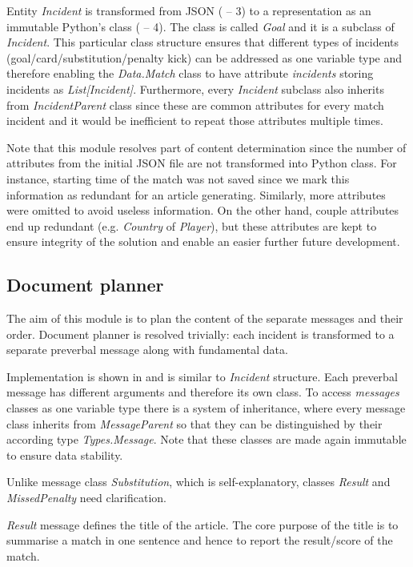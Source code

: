 Entity \emph{Incident} is transformed from JSON ( -- 3) to a representation as an immutable Python's class ( -- 4). The class is called \emph{Goal} and it is a subclass of \emph{Incident}. This particular class structure ensures that different types of incidents (goal/card/substitution/penalty kick) can be addressed as one variable type and therefore enabling the \textit{Data.Match} class to have attribute \textit{incidents} storing incidents as \emph{List[Incident]}. Furthermore, every \textit{Incident} subclass also inherits from \emph{IncidentParent} class since these are common attributes for every match incident and it would be inefficient to repeat those attributes multiple times.

Note that this module resolves part of content determination since the number of attributes from the initial JSON file are not transformed into Python class. For instance, starting time of the match was not saved since we mark this information as redundant for an article generating. Similarly, more attributes were omitted to avoid useless information. On the other hand, couple attributes end up redundant (e.g. \textit{Country} of \textit{Player}), but these attributes are kept to ensure integrity of the solution and enable an easier further future development. 

\subsection{Document planner}

The aim of this module is to plan the content of the separate messages and their order. Document planner is resolved trivially: each incident is transformed to a separate preverbal message along with fundamental data. 

Implementation is shown in  and is similar to \textit{Incident} structure. Each preverbal message has different arguments and therefore its own class. To access \textit{messages} classes as one variable type there is a system of inheritance, where every message class inherits from \textit{MessageParent} so that they can be distinguished by their according type \textit{Types.Message}. Note that these classes are made again immutable to ensure data stability.

Unlike message class \textit{Substitution}, which is self-explanatory, classes \textit{Result} and \textit{MissedPenalty} need clarification. 

\textit{Result} message defines the title of the article. The core purpose of the title is to summarise a match in one sentence and hence to report the result/score of the match. 

